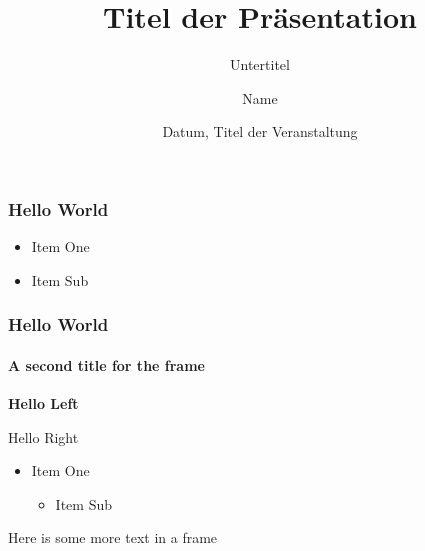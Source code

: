 \documentclass[aspectratio=169,10pt]{beamer}
\title{Titel der Pr\"asentation}
\subtitle{Untertitel}
\author{Name}
\institute{Institut XY\\Universität Bern}
\date{Datum, Titel der Veranstaltung}
\begin{document}
\begin{frame}
\maketitle
\end{frame}

\begin{frame}
	\frametitle{Hello World}
	\begin{itemize}
	\item Item One
	\item Item Sub
	\end{itemize}
\end{frame}

\begin{frame}
	\frametitle{Hello World}
\framesubtitle{A second title for the frame}
\begin{flushleft}
\textbf{Hello Left}
\end{flushleft}
\begin{flushright}
Hello Right
\end{flushright}

\begin{itemize}
\item Item One
\begin{itemize}
\item Item Sub
\end{itemize}
\end{itemize}
\end{frame}

\begin{frame}
Here is some more text in a frame
\end{frame}
\end{document}
